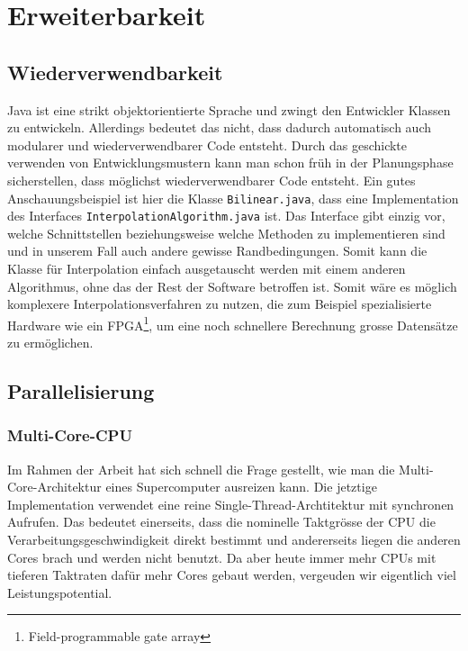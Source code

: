 
\section{Erweiterbarkeit}
\subsection{Wiederverwendbarkeit}
Java ist eine strikt objektorientierte Sprache und zwingt den Entwickler
Klassen zu entwickeln. Allerdings bedeutet das nicht, dass dadurch automatisch
auch modularer und wiederverwendbarer Code entsteht. Durch das geschickte
verwenden von Entwicklungsmustern kann man schon früh in der Planungsphase
sicherstellen, dass möglichst wiederverwendbarer Code entsteht. Ein gutes
Anschauungsbeispiel ist hier die Klasse \texttt{Bilinear.java}, dass eine
Implementation des Interfaces \texttt{InterpolationAlgorithm.java} ist. Das
Interface gibt einzig vor, welche Schnittstellen beziehungsweise welche
Methoden zu implementieren sind und in unserem Fall auch andere gewisse
Randbedingungen. Somit kann die Klasse für Interpolation einfach ausgetauscht
werden mit einem anderen Algorithmus, ohne das der Rest der Software betroffen
ist. Somit wäre es möglich komplexere Interpolationsverfahren zu nutzen, die
zum Beispiel spezialisierte Hardware wie ein FPGA\footnote{Field-programmable
gate array}, um eine noch schnellere Berechnung grosse Datensätze zu
ermöglichen.

\subsection{Parallelisierung}
\subsubsection{Multi-Core-CPU}
Im Rahmen der Arbeit hat sich schnell die Frage gestellt, wie man die
Multi-Core-Architektur eines Supercomputer ausreizen kann. Die jetztige
Implementation verwendet eine reine Single-Thread-Archtitektur mit synchronen
Aufrufen. Das bedeutet einerseits, dass die nominelle Taktgrösse der CPU die
Verarbeitungsgeschwindigkeit direkt bestimmt und andererseits liegen die
anderen Cores brach und werden nicht benutzt. Da aber heute immer mehr CPUs
mit tieferen Taktraten dafür mehr Cores gebaut werden, vergeuden wir
eigentlich viel Leistungspotential.

